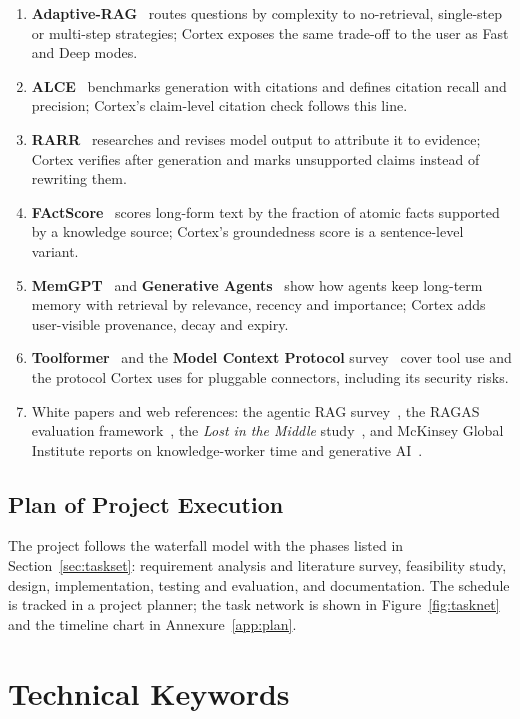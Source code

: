 \documentclass[oneside,a4paper,12pt]{report}
\begin{document}
\begin{enumerate}
\item \textbf{Adaptive-RAG}~\cite{jeong2024adaptiverag} routes questions by complexity to no-retrieval, single-step or multi-step strategies; Cortex exposes the same trade-off to the user as Fast and Deep modes.
\item \textbf{ALCE}~\cite{gao2023alce} benchmarks generation with citations and defines citation recall and precision; Cortex's claim-level citation check follows this line.
\item \textbf{RARR}~\cite{gao2023rarr} researches and revises model output to attribute it to evidence; Cortex verifies after generation and marks unsupported claims instead of rewriting them.
\item \textbf{FActScore}~\cite{min2023factscore} scores long-form text by the fraction of atomic facts supported by a knowledge source; Cortex's groundedness score is a sentence-level variant.
\item \textbf{MemGPT}~\cite{packer2023memgpt} and \textbf{Generative Agents}~\cite{park2023generative} show how agents keep long-term memory with retrieval by relevance, recency and importance; Cortex adds user-visible provenance, decay and expiry.
\item \textbf{Toolformer}~\cite{schick2023toolformer} and the \textbf{Model Context Protocol} survey~\cite{hou2025mcp} cover tool use and the protocol Cortex uses for pluggable connectors, including its security risks.
\item White papers and web references: the agentic RAG survey~\cite{singh2025agenticrag}, the RAGAS evaluation framework~\cite{es2024ragas}, the \emph{Lost in the Middle} study~\cite{liu2024lost}, and McKinsey Global Institute reports on knowledge-worker time and generative AI~\cite{mckinseyweb,mckinsey}.
\end{enumerate}

\section{Plan of Project Execution}
The project follows the waterfall model with the phases listed in Section~\ref{sec:taskset}: requirement analysis and literature survey, feasibility study, design, implementation, testing and evaluation, and documentation. The schedule is tracked in a project planner; the task network is shown in Figure~\ref{fig:tasknet} and the timeline chart in Annexure~\ref{app:plan}.



\chapter{Technical Keywords}
\end{document}
